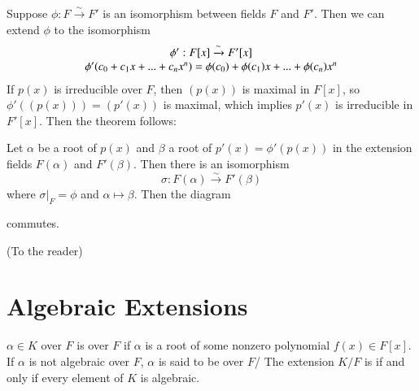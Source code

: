 \documentclass[12pt, a4paper, twoside, openright, titlepage]{book}
\begin{document}
\begin{rmk}{}{}
    Suppose $\phi:F\xrightarrow{\sim} F'$ is an isomorphism between fields $F$ and $F'$. Then we can extend $\phi$ to the isomorphism \begin{equation}
        \begin{array}{c} \phi':F[x]\xrightarrow{\sim}{F'[x]} \\ \phi'(c_0+c_1x+...+c_nx^n) = \phi(c_0)+\phi(c_1)x+...+\phi(c_n)x^n \end{array}
    \end{equation}
    If $p(x)$ is irreducible over $F$, then $(p(x))$ is maximal in $F[x]$, so $\phi'((p(x))) = (p'(x))$ is maximal, which implies $p'(x)$ is irreducible in $F'[x]$. Then the theorem follows:
\end{rmk}


\begin{thm}{}{}
    Let $\alpha$ be a root of $p(x)$ and $\beta$ a root of $p'(x) = \phi'(p(x))$ in the extension fields $F(\alpha)$ and $F'(\beta)$. Then there is an isomorphism \begin{equation}
        \sigma:F(\alpha)\xrightarrow{\sim}F'(\beta)
    \end{equation}
    where $\sigma\rvert_F = \phi$ and $\alpha \mapsto \beta$. Then the diagram
        \begin{center}
        \end{center}
    commutes.
\end{thm}
\begin{proof*}{}{}
    (To the reader)
\end{proof*}



\section{\textsection Algebraic Extensions}

\begin{defn}{}{}
    $\alpha \in K$ over $F$ is  over $F$ if $\alpha$ is a root of some nonzero polynomial $f(x) \in F[x]$. If $\alpha$ is not algebraic over $F$, $\alpha$ is said to be  over $F$/ The extension $K/F$ is  if and only if every element of $K$ is algebraic.
\end{defn}
\end{document}
